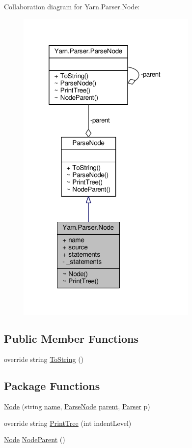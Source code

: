 Collaboration diagram for Yarn.\-Parser.\-Node\-:
\nopagebreak
\begin{figure}[H]
\begin{center}
\leavevmode
\includegraphics[width=251pt]{d3/d5e/a00275}
\end{center}
\end{figure}
\subsection*{Public Member Functions}
\begin{DoxyCompactItemize}
\item 
override string \hyperlink{a00063_a18c67cb16090d0889bb9d6c8c6c565f8}{To\-String} ()
\end{DoxyCompactItemize}
\subsection*{Package Functions}
\begin{DoxyCompactItemize}
\item 
\hyperlink{a00054_ae0562dc06ca747307b66039ef2f28772}{Node} (string \hyperlink{a00054_a3cfa07840da3a7a92c820788e902aefb}{name}, \hyperlink{a00063}{Parse\-Node} \hyperlink{a00063_af313a82103fcc2ff5a177dbb06b92f7b}{parent}, \hyperlink{a00064}{Parser} p)
\item 
override string \hyperlink{a00054_ab11501ebf251fdaa7cfe44edfa993068}{Print\-Tree} (int indent\-Level)
\item 
\hyperlink{a00054}{Node} \hyperlink{a00063_a580e520a29444fc23ac3660cbe514a09}{Node\-Parent} ()
\end{DoxyCompactItemize}
